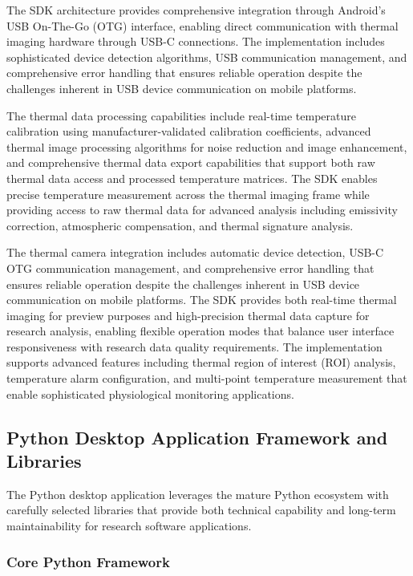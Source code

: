 \documentclass[11pt,a4paper]{report}
\begin{document}
The SDK architecture provides comprehensive integration through Android's USB On-The-Go (OTG) interface, enabling direct communication with thermal imaging hardware through USB-C connections. The implementation includes sophisticated device detection algorithms, USB communication management, and comprehensive error handling that ensures reliable operation despite the challenges inherent in USB device communication on mobile platforms.

The thermal data processing capabilities include real-time temperature calibration using manufacturer-validated calibration coefficients, advanced thermal image processing algorithms for noise reduction and image enhancement, and comprehensive thermal data export capabilities that support both raw thermal data access and processed temperature matrices. The SDK enables precise temperature measurement across the thermal imaging frame while providing access to raw thermal data for advanced analysis including emissivity correction, atmospheric compensation, and thermal signature analysis.

The thermal camera integration includes automatic device detection, USB-C OTG communication management, and comprehensive error handling that ensures reliable operation despite the challenges inherent in USB device communication on mobile platforms. The SDK provides both real-time thermal imaging for preview purposes and high-precision thermal data capture for research analysis, enabling flexible operation modes that balance user interface responsiveness with research data quality requirements. The implementation supports advanced features including thermal region of interest (ROI) analysis, temperature alarm configuration, and multi-point temperature measurement that enable sophisticated physiological monitoring applications.

\subsection{Python Desktop Application Framework and Libraries}

The Python desktop application leverages the mature Python ecosystem with carefully selected libraries that provide both technical capability and long-term maintainability for research software applications.

\subsubsection{Core Python Framework}
\end{document}
